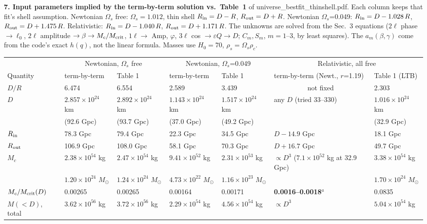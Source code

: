 \documentclass[10pt]{article}
\begin{document}
{\textbf{7. Input parameters implied by the term-by-term solution vs.\ Table~1} of universe\_bestfit\_thinshell.pdf. Each column keeps that fit's shell assumption. Newtonian $\Omega_s$ free: $\Omega_s=1.012$, thin shell $R_{\rm in}=D-R$, $R_{\rm out}=D+R$. Newtonian $\Omega_s$=0.049: $R_{\rm in}=D-1.028\,R$, $R_{\rm out}=D+1.475\,R$. Relativistic: $R_{\rm in}=D-1.040\,R$, $R_{\rm out}=D+1.171\,R$. The unknowns are solved from the Sec.~3 equations ($2\ell$ phase $\to\ell_0$, $2\ell$ amplitude $\to\beta\to M_c/M_{\rm crit}$, $1\ell\to$ Amp, $\varphi$, $3\ell$ cos $\to\varepsilon Q\to D$; $C_m,S_m$, $m=1$--3, by least squares). The $a_m(\beta,\gamma)$ come from the code's exact $h(q)$, not the linear formula. Masses use $H_0=70$, $\rho_s=\Omega_s\rho_c$.
\begin{center}\footnotesize\setlength{\tabcolsep}{2.6pt}\begin{tabular}{lllllll}\toprule
 & \multicolumn{2}{c}{Newtonian, $\Omega_s$ free} & \multicolumn{2}{c}{Newtonian, $\Omega_s$=0.049} & \multicolumn{2}{c}{Relativistic, all free}\\
Quantity & term-by-term & Table 1 & term-by-term & Table 1 & term-by-term (Newt., $r$=1.19) & Table 1 (LTB)\\\midrule
$D/R$ & 6.474 & 6.554 & 2.589 & 3.439 & \multicolumn{1}{c}{not fixed} & 2.303\\
$D$ & $2.857{\times}10^{24}$ km & $2.892{\times}10^{24}$ km & $1.143{\times}10^{24}$ km & $1.517{\times}10^{24}$ km & any $D$ (tried 33--330) & $1.016{\times}10^{24}$ km\\
 & (92.6 Gpc) & (93.7 Gpc) & (37.0 Gpc) & (49.2 Gpc) &  & (32.9 Gpc)\\
$R_{\rm in}$ & 78.3 Gpc & 79.4 Gpc & 22.3 Gpc & 34.5 Gpc & $D-14.9$ Gpc & 18.1 Gpc\\
$R_{\rm out}$ & 106.9 Gpc & 108.0 Gpc & 58.1 Gpc & 70.3 Gpc & $D+16.7$ Gpc & 49.7 Gpc\\
$M_c$ & $2.38{\times}10^{54}$ kg & $2.47{\times}10^{54}$ kg & $9.41{\times}10^{52}$ kg & $2.31{\times}10^{53}$ kg & $\propto D^3$ ($7.1{\times}10^{52}$ kg at 32.9 Gpc) & $3.38{\times}10^{54}$ kg\\
 & $1.20{\times}10^{24}$ $M_\odot$ & $1.24{\times}10^{24}$ $M_\odot$ & $4.73{\times}10^{22}$ $M_\odot$ & $1.16{\times}10^{23}$ $M_\odot$ &  & $1.70{\times}10^{24}$ $M_\odot$\\
$M_c/M_{\rm crit}(D)$ & 0.00265 & 0.00265 & 0.00164 & 0.00171 & \textbf{0.0016--0.0018}$^a$ & 0.0835\\
$M(<D)$, total & $3.62{\times}10^{56}$ kg & $3.72{\times}10^{56}$ kg & $2.29{\times}10^{54}$ kg & $4.56{\times}10^{54}$ kg & $\propto D^3$ & $5.04{\times}10^{54}$ kg\\

\end{tabular}
\end{center}}
\end{document}
